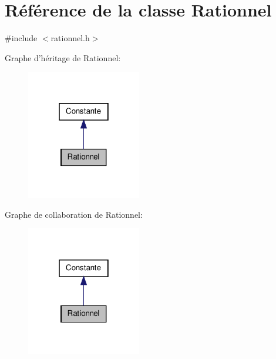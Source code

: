 \hypertarget{class_rationnel}{\section{\-Référence de la classe \-Rationnel}
\label{class_rationnel}
}


{\ttfamily \#include $<$rationnel.\-h$>$}



\-Graphe d'héritage de \-Rationnel\-:\nopagebreak
\begin{figure}[H]
\begin{center}
\leavevmode
\includegraphics[width=142pt]{class_rationnel__inherit__graph}
\end{center}
\end{figure}


\-Graphe de collaboration de \-Rationnel\-:\nopagebreak
\begin{figure}[H]
\begin{center}
\leavevmode
\includegraphics[width=142pt]{class_rationnel__coll__graph}
\end{center}
\end{figure}

